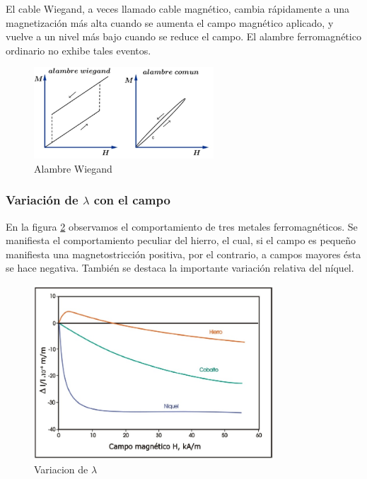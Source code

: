 El cable Wiegand, a veces llamado cable magnético, cambia rápidamente a una magnetización más alta cuando se aumenta el campo magnético aplicado, y vuelve a un nivel más bajo cuando se reduce el campo. El alambre ferromagnético ordinario no exhibe tales eventos.

\begin{figure}[H]
    \centering
    \includegraphics[width=0.6\textwidth]{./Figures/alambreWiegand}
	\caption{Alambre Wiegand}
	\label{fig:alambreWiegand}
\end{figure}


\subsubsection{Variación de $\lambda$ con el campo}

En la figura \ref{fig:variacionDeLambda} observamos el comportamiento de tres metales ferromagnéticos. Se manifiesta el
comportamiento peculiar del hierro, el cual, si el campo es pequeño manifiesta una magnetostricción positiva, por el contrario, a campos mayores ésta se hace negativa. También se destaca la importante variación relativa del níquel.


\begin{figure}[H]
    \centering
    \includegraphics[width=0.8\textwidth]{./Figures/variacionDeLambda}
	\caption{Variacion de $\lambda$}
	\label{fig:variacionDeLambda}
\end{figure}

